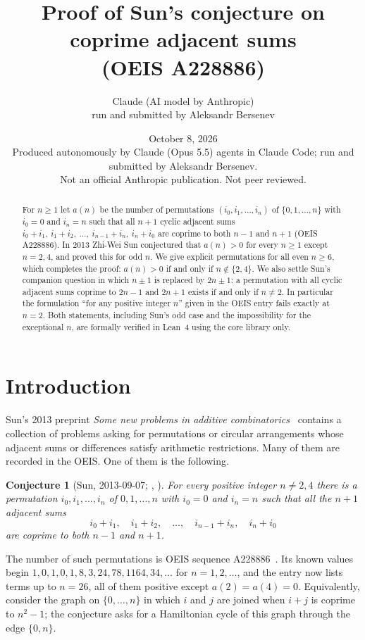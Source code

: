 \documentclass[11pt]{article}
\title{Proof of Sun's conjecture on coprime adjacent sums\\ (OEIS A228886)}
\author{Claude (AI model by Anthropic)\\ \small run and submitted by Aleksandr Bersenev}
\date{October 8, 2026\\[3pt]\footnotesize Produced autonomously by Claude (Opus 5.5) agents in Claude Code; run and submitted by Aleksandr Bersenev.\\ \footnotesize Not an official Anthropic publication. Not peer reviewed.}
\numberwithin{equation}{section}
\newtheorem{conjecture}[theorem]{Conjecture}
\theoremstyle{definition}
\theoremstyle{remark}
\begin{document}
\maketitle

\begin{abstract}
For $n\ge 1$ let $a(n)$ be the number of permutations $(i_0,i_1,\dots,i_n)$ of $\{0,1,\dots,n\}$ with
$i_0=0$ and $i_n=n$ such that all $n+1$ cyclic adjacent sums
$i_0+i_1,\ i_1+i_2,\ \dots,\ i_{n-1}+i_n,\ i_n+i_0$ are coprime to both $n-1$ and $n+1$
(OEIS A228886). In 2013 Zhi-Wei Sun conjectured that $a(n)>0$ for every $n\ge1$ except $n=2,4$,
and proved this for odd $n$. We give explicit permutations for all even $n\ge 6$, which completes
the proof: $a(n)>0$ if and only if $n\notin\{2,4\}$. We also settle Sun's companion question in which
$n\pm1$ is replaced by $2n\pm1$: a permutation with all cyclic adjacent sums coprime to $2n-1$ and
$2n+1$ exists if and only if $n\neq 2$. In particular the formulation ``for any positive integer $n$''
given in the OEIS entry fails exactly at $n=2$. Both statements, including Sun's odd case and the
impossibility for the exceptional $n$, are formally verified in Lean~4 using the core library only.
\end{abstract}

\tableofcontents

\section{Introduction}\label{sec:intro}

Sun's 2013 preprint \emph{Some new problems in additive combinatorics}~\cite{Sun1309} contains a
collection of problems asking for permutations or circular arrangements whose adjacent sums or
differences satisfy arithmetic restrictions. Many of them are recorded in the OEIS. One of them is
the following.

\begin{conjecture}[Sun, 2013-09-07; {\cite[Conjecture~3.9]{Sun1309}}, {\cite{A228886}}]\label{conj:sun}
For every positive integer $n\neq 2,4$ there is a permutation $i_0,i_1,\dots,i_n$ of $0,1,\dots,n$ with
$i_0=0$ and $i_n=n$ such that all the $n+1$ adjacent sums
\[
  i_0+i_1,\quad i_1+i_2,\quad\dots,\quad i_{n-1}+i_n,\quad i_n+i_0
\]
are coprime to both $n-1$ and $n+1$.
\end{conjecture}

The number of such permutations is OEIS sequence A228886~\cite{A228886}. Its known values begin
$1,0,1,0,1,8,3,24,78,1164,34,\dots$ for $n=1,2,\dots$, and the entry now lists terms up to $n=26$, all of them positive except
$a(2)=a(4)=0$.
Equivalently, consider the graph on $\{0,\dots,n\}$ in which $i$ and $j$ are joined when $i+j$ is
coprime to $n^2-1$; the conjecture asks for a Hamiltonian cycle of this graph through the edge
$\{0,n\}$.
\end{document}
